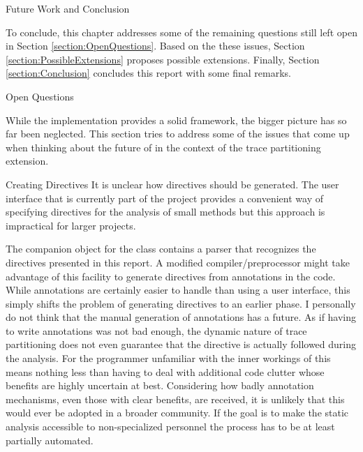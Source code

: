 \begin{chapter}{Future Work and Conclusion}
	\label{chapter:Discussion}

	To conclude, this chapter addresses some of the remaining questions still left open in Section \ref{section:OpenQuestions}. Based on the these issues, Section \ref{section:PossibleExtensions} proposes possible extensions. Finally, Section \ref{section:Conclusion} concludes this report with some final remarks.


	\begin{section}{Open Questions}
		\label{section:OpenQuestions}

		While the implementation provides a solid framework, the bigger picture has so far been neglected. This section tries to address some of the issues that come up when thinking about the future of \sample in the context of the trace partitioning extension.
		

		\begin{subsection}{Creating Directives}
			It is unclear how directives should be generated. The user interface that is currently part of the \sample project provides a convenient way of specifying directives for the analysis of small methods but this approach is impractical for larger projects.

			The companion object for the  class contains a parser that recognizes the directives presented in this report. A modified compiler/preprocessor might take advantage of this facility to generate directives from annotations in the code. While annotations are certainly easier to handle than using a user interface, this simply shifts the problem of generating directives to an earlier phase. I personally do not think that the manual generation of annotations has a future. As if having to write annotations was not bad enough, the dynamic nature of trace partitioning does not even guarantee that the directive is actually followed during the analysis. For the programmer unfamiliar with the inner workings of \sample this means nothing less than having to deal with additional code clutter whose benefits are highly uncertain at best. Considering how badly annotation mechanisms, even those with clear benefits, are received, it is unlikely that this would ever be adopted in a broader community. If the goal is to make the static analysis accessible to non-specialized personnel the process has to be at least partially automated. 


\end{subsection}
\end{section}
\end{chapter}
